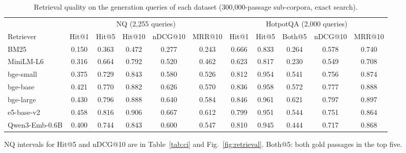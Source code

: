 \begin{table}[t]
\centering
\footnotesize
\setlength{\tabcolsep}{3.5pt}
\caption{Retrieval quality on the generation queries of each dataset (300,000-passage sub-corpora, exact search).}
\label{tab:retrieval}
\begin{tabular}{lcccccccccc}
\toprule
 & \multicolumn{5}{c}{NQ (2,255 queries)} & \multicolumn{5}{c}{HotpotQA (2,000 queries)} \\ \cmidrule(lr){2-6}\cmidrule(lr){7-11}
Retriever & Hit@1 & Hit@5 & Hit@10 & nDCG@10 & MRR@10 & Hit@1 & Hit@5 & Both@5 & nDCG@10 & MRR@10 \\
\midrule
BM25 & 0.150 & 0.363 & 0.472 & 0.277 & 0.243 & 0.666 & 0.833 & 0.264 & 0.578 & 0.740 \\
MiniLM-L6 & 0.316 & 0.664 & 0.792 & 0.520 & 0.462 & 0.623 & 0.817 & 0.230 & 0.549 & 0.708 \\
bge-small & 0.375 & 0.729 & 0.843 & 0.580 & 0.526 & 0.812 & 0.954 & 0.541 & 0.756 & 0.874 \\
bge-base & 0.421 & 0.770 & 0.882 & 0.626 & 0.570 & 0.836 & 0.958 & 0.572 & 0.777 & 0.888 \\
bge-large & 0.430 & 0.796 & 0.888 & 0.640 & 0.584 & 0.846 & 0.961 & 0.621 & 0.797 & 0.897 \\
e5-base-v2 & 0.458 & 0.816 & 0.906 & 0.667 & 0.612 & 0.799 & 0.951 & 0.544 & 0.751 & 0.864 \\
Qwen3-Emb-0.6B & 0.400 & 0.744 & 0.843 & 0.600 & 0.547 & 0.810 & 0.945 & 0.444 & 0.717 & 0.868 \\
\bottomrule
\end{tabular}
\par\smallskip\parbox{\linewidth}{\footnotesize NQ intervals for Hit@5 and nDCG@10 are in Table~\ref{tab:ci} and Fig.~\ref{fig:retrieval}. Both@5: both gold passages in the top five.}
\end{table}

